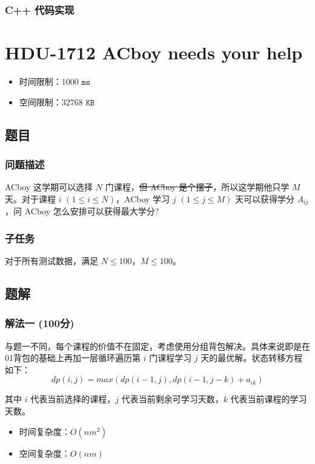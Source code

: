 \documentclass[UTF8, 12pt, a4paper, oneside]{ctexart}
\begin{document}
\subsubsection{C++ 代码实现}


\section{HDU-1712 ACboy needs your help}
\begin{itemize}
    \item 时间限制：$1000\texttt{ ms}$
    \item 空间限制：$32768\texttt{ KB}$
\end{itemize}
\subsection{题目}
\subsubsection{问题描述}
\par ACboy 这学期可以选择 $N$ 门课程，\sout{但 ACboy 是个摆子}，所以这学期他只学 $M$ 天。对于课程 $i$ $(1 \leq i \leq N)$，ACboy 学习 $j$ $(1 \leq j \leq M)$ 天可以获得学分 $A_{ij}$，问 ACboy 怎么安排可以获得最大学分?
\subsubsection{子任务}
\par 对于所有测试数据，满足 $N \leq 100$，$M \leq 100$。
\subsection{题解}
\subsubsection{解法一 (100分)}
\par 与题一不同，每个课程的价值不在固定，考虑使用分组背包解决。具体来说即是在01背包的基础上再加一层循环遍历第 $i$ 门课程学习 $j$ 天的最优解。状态转移方程如下：$$dp(i, j) = max(dp(i-1, j), dp(i-1, j-k) + a_{ik})$$
\par 其中 $i$ 代表当前选择的课程，$j$ 代表当前剩余可学习天数，$k$ 代表当前课程的学习天数。
\begin{itemize}
    \item 时间复杂度：$O(nm^2)$
    \item 空间复杂度：$O(nm)$
\end{itemize}
\end{document}
